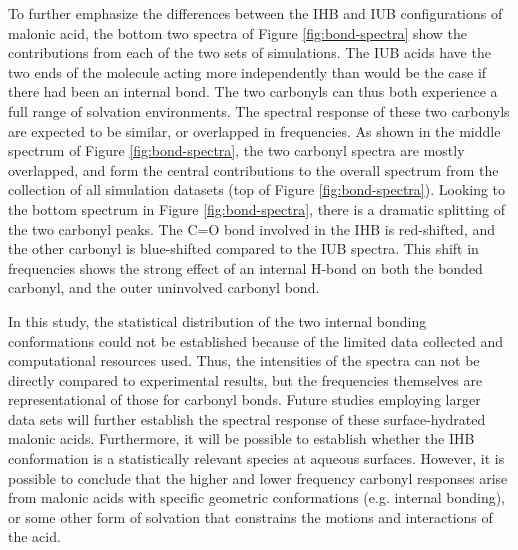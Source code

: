 To further emphasize the differences between the IHB and IUB configurations of malonic acid, the bottom two spectra of Figure \ref{fig:bond-spectra} show the contributions from each of the two sets of simulations. The IUB acids have the two ends of the molecule acting more independently than would be the case if there had been an internal bond. The two carbonyls can thus both experience a full range of solvation environments. The spectral response of these two carbonyls are expected to be similar, or overlapped in frequencies. As shown in the middle spectrum of Figure \ref{fig:bond-spectra}, the two carbonyl spectra are mostly overlapped, and form the central contributions to the overall spectrum from the collection of all simulation datasets (top of Figure \ref{fig:bond-spectra}). Looking to the bottom spectrum in Figure \ref{fig:bond-spectra}, there is a dramatic splitting of the two carbonyl peaks. The C=O bond involved in the IHB is red-shifted, and the other carbonyl is blue-shifted compared to the IUB spectra. This shift in frequencies shows the strong effect of an internal H-bond on both the bonded carbonyl, and the outer uninvolved carbonyl bond.

In this study, the statistical distribution of the two internal bonding conformations could not be established because of the limited data collected and computational resources used. Thus, the intensities of the spectra can not be directly compared to experimental results, but the frequencies themselves are representational of those for carbonyl bonds. Future studies employing larger data sets will further establish the spectral response of these surface-hydrated malonic acids. Furthermore, it will be possible to establish whether the IHB conformation is a statistically relevant species at aqueous surfaces. However, it is possible to conclude that the higher and lower frequency carbonyl responses arise from malonic acids with specific geometric conformations (e.g. internal bonding), or some other form of solvation that constrains the motions and interactions of the acid.
